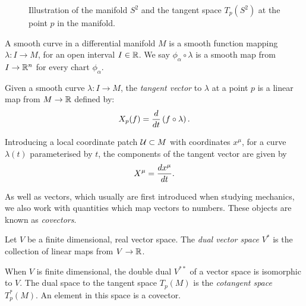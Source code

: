 \begin{figure}[!h]
\centering
{}	
\caption[Illustration of the manifold $S^2$ and the tangent space $T_p(S^2)$]{Illustration of the manifold $S^2$ and the tangent space $T_p(S^2)$ at the point $p$ in the manifold.}
\label{fig:spheretangent}
\end{figure}



\begin{defn}
A smooth curve in a differential manifold $M$ is a smooth function mapping $\lambda: I \rightarrow M$, for an open interval $I \in {\mathbb{R}}$. We say $\phi_\alpha \circ \lambda$ is a smooth map from $I \rightarrow {\mathbb{R}}^n$ for every chart $\phi_\alpha$. 
\end{defn}

\begin{defn}
	Given a smooth curve $\lambda: I \rightarrow M$, the \emph{tangent vector} to $\lambda$ at a point $p$ is a linear map from $M \rightarrow {\mathbb{R}}$ defined by:
	\begin{equation*}
		X_p(f) = \frac{d }{d t} \left(f \circ \lambda \right) .
	\end{equation*}
\end{defn}

Introducing a local coordinate patch ${\cal U} \subset M$ with coordinates ${x^\mu}$, for a curve $\lambda(t)$ parameterised by $t$, the components of the tangent vector are given by
\begin{equation*}
	X^\mu = \frac{d x^\mu}{d t}.
\end{equation*}

As well as vectors, which usually are first introduced when studying mechanics, we also work with quantities which map vectors to numbers. These objects are known as \emph{covectors}.
\begin{defn}
	Let $V$ be a finite dimensional, real vector space. The \emph{dual vector space} $V^*$ is the collection of linear maps from $V \rightarrow {\mathbb{R}}$.
\end{defn}
When $V$ is finite dimensional, the double dual $V^{**}$ of a vector space is isomorphic to $V$. The dual space to the tangent space $T_p(M)$ is the \emph{cotangent space} $T^*_p(M)$. An element in this space is a covector.

